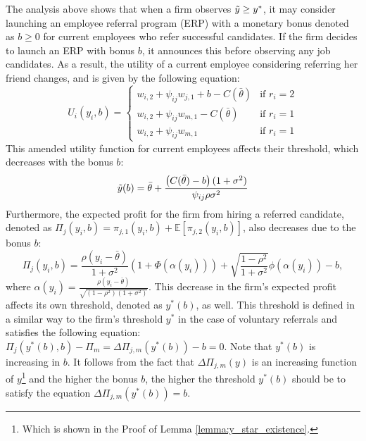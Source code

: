 \documentclass[12pt]{article}
\begin{document}
The analysis above shows that when a firm observes $\Tilde{y} \geq y^*$, it may consider launching an employee referral program (ERP) with a monetary bonus denoted as $b \geq 0$ for current employees who refer successful candidates. If the firm decides to launch an ERP with bonus $b$, it announces this before observing any job candidates. As a result, the utility of a current employee considering referring her friend changes, and is given by the following equation:
\begin{equation}
        U_{i}(y_i, b) = 
        \begin{cases}
		w_{i,2} + \psi_{ij} w_{j,1}+ b - C(\bar{\theta}) & \text{if } r_i = 2 \\ %
		w_{i,2} + \psi_{ij} w_{m,1} - C(\bar{\theta}) & \text{if } r_i = 1 \\
        w_{i,2} + \psi_{ij} w_{m,1} & \text{if } r_i = 1
        \end{cases}
\end{equation}
This amended utility function for current employees affects their threshold, which decreases with the bonus $b$:
\begin{equation}\label{eq_tilde_y_b}
    \Tilde{y}(b) = \bar{\theta}+\frac{\left(C(\bar{\theta})-b\right)(1+\sigma^2)}{\psi_{ij}\rho\sigma^2}
\end{equation}
Furthermore, the expected profit for the firm from hiring a referred candidate, denoted as $\Pi_j(y_i,b) = \pi_{j,1}(y_i, b)+ \mathbb{E}[\pi_{j,2}(y_i,b)]$, also decreases due to the bonus $b$:
\begin{equation}
\Pi_j(y_i, b)
= \frac{\rho\left(y_i-\bar{\theta}\right)}{1+\sigma^2}\left(1+\Phi\left(\alpha(y_i)\right)\right)
+ \sqrt{\frac{1-\rho^2}{1+\sigma^2}}\phi\left(\alpha(y_i)\right)-b,
\end{equation}
where $\alpha(y_i) = \frac{\rho\left(y_i - \bar{\theta}\right)}{\sqrt{(1-\rho^2)(1+\sigma^2)}}$. This decrease in the firm's expected profit affects its own threshold, denoted as $y^*(b)$, as well. This threshold is defined in a similar way to the firm's threshold $y^*$ in the case of voluntary referrals and satisfies the following equation: $\Pi_j(y^*(b),b) - \Pi_m = \Delta\Pi_{j,m}\left(y^*(b)\right)-b = 0$. Note that $y^*(b)$ is increasing in $b$. It follows from the fact that $\Delta\Pi_{j,m}(y)$ is an increasing function of $y$\footnote{Which is shown in the Proof of Lemma \ref{lemma:y_star_existence}.} and the higher the bonus $b$, the higher the threshold $y^*(b)$ should be to satisfy the equation $\Delta\Pi_{j,m}\left(y^*(b)\right)=b$.
\end{document}
